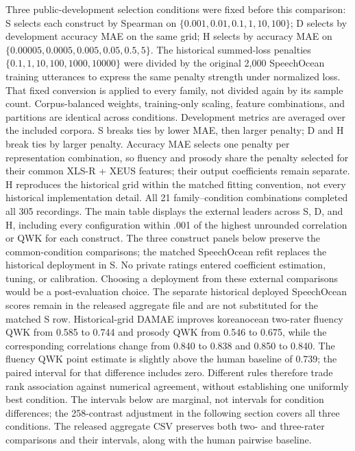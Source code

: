 \documentclass[10pt]{article}
\begin{document}
Three public-development selection conditions were fixed before this comparison: S selects each construct by Spearman on $\{0.001,0.01,0.1,1,10,100\}$; D selects by development accuracy MAE on the same grid; H selects by accuracy MAE on $\{0.00005,0.0005,0.005,0.05,0.5,5\}$. The historical summed-loss penalties $\{0.1,1,10,100,1000,10000\}$ were divided by the original 2,000 SpeechOcean training utterances to express the same penalty strength under normalized loss. That fixed conversion is applied to every family, not divided again by its sample count. Corpus-balanced weights, training-only scaling, feature combinations, and partitions are identical across conditions. Development metrics are averaged over the included corpora. S breaks ties by lower MAE, then larger penalty; D and H break ties by larger penalty. Accuracy MAE selects one penalty per representation combination, so fluency and prosody share the penalty selected for their common XLS-R + XEUS features; their output coefficients remain separate. H reproduces the historical grid within the matched fitting convention, not every historical implementation detail.
All 21 family--condition combinations completed all 305 recordings. The main table displays the external leaders across S, D, and H, including every configuration within .001 of the highest unrounded correlation or QWK for each construct. The three construct panels below preserve the common-condition comparisons; the matched SpeechOcean refit replaces the historical deployment in S. No private ratings entered coefficient estimation, tuning, or calibration. Choosing a deployment from these external comparisons would be a post-evaluation choice. The separate historical deployed SpeechOcean scores remain in the released aggregate file and are not substituted for the matched S row.
Historical-grid DAMAE improves koreanocean two-rater fluency QWK from 0.585 to 0.744 and prosody QWK from 0.546 to 0.675, while the corresponding correlations change from 0.840 to 0.838 and 0.850 to 0.840. The fluency QWK point estimate is slightly above the human baseline of 0.739; the paired interval for that difference includes zero. Different rules therefore trade rank association against numerical agreement, without establishing one uniformly best condition. The intervals below are marginal, not intervals for condition differences; the 258-contrast adjustment in the following section covers all three conditions. The released aggregate CSV preserves both two- and three-rater comparisons and their intervals, along with the human pairwise baseline.
\end{document}
